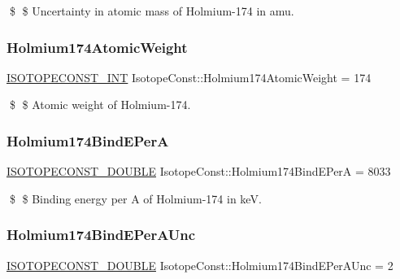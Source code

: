 \$ \$ Uncertainty in atomic mass of Holmium-\/174 in amu. \mbox{\label{group___isotope_const-_holmium-_ho174_ga06a3eb6a6764bb3efc4bf7f9073582d1}} 
\subsubsection{\texorpdfstring{Holmium174\+Atomic\+Weight}{Holmium174AtomicWeight}}
{\footnotesize\ttfamily \mbox{\hyperlink{group___isotope_const-_macros_ga5f18360b3e99483a35c32d789e62621c}{I\+S\+O\+T\+O\+P\+E\+C\+O\+N\+S\+T\+\_\+\+I\+NT}} Isotope\+Const\+::\+Holmium174\+Atomic\+Weight = 174}

\$ \$ Atomic weight of Holmium-\/174. \mbox{\label{group___isotope_const-_holmium-_ho174_ga38918850b2f44a4d9ae24c2705c78c72}} 
\subsubsection{\texorpdfstring{Holmium174\+Bind\+E\+PerA}{Holmium174BindEPerA}}
{\footnotesize\ttfamily \mbox{\hyperlink{group___isotope_const-_macros_ga8f45a7272ce02c0b4c65c44636ed719a}{I\+S\+O\+T\+O\+P\+E\+C\+O\+N\+S\+T\+\_\+\+D\+O\+U\+B\+LE}} Isotope\+Const\+::\+Holmium174\+Bind\+E\+PerA = 8033}

\$ \$ Binding energy per A of Holmium-\/174 in keV. \mbox{\label{group___isotope_const-_holmium-_ho174_ga22d9a7528443211ba84d666f4b60dd7e}} 
\subsubsection{\texorpdfstring{Holmium174\+Bind\+E\+Per\+A\+Unc}{Holmium174BindEPerAUnc}}
{\footnotesize\ttfamily \mbox{\hyperlink{group___isotope_const-_macros_ga8f45a7272ce02c0b4c65c44636ed719a}{I\+S\+O\+T\+O\+P\+E\+C\+O\+N\+S\+T\+\_\+\+D\+O\+U\+B\+LE}} Isotope\+Const\+::\+Holmium174\+Bind\+E\+Per\+A\+Unc = 2}

